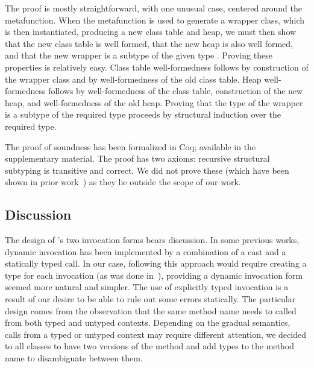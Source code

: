 \documentclass[USenglish]{tex/lipics-v2016}
\begin{document}
\noindent
The proof is mostly straightforward, with one unusual case, centered around
the  metafunction. When the  metafunction is used to
generate a wrapper class, which is then instantiated, producing a new class
table and heap, we must then show that the new class table is well formed,
that the new heap is also well formed, and that the new wrapper is a subtype
of the given type \C.  Proving these properties is relatively easy.  Class
table well-formedness follows by construction of the wrapper class and by
well-formedness of the old class table. Heap well-formedness follows by
well-formedness of the class table, construction of the new heap, and
well-formedness of the old heap.  Proving that the type of the wrapper is a
subtype of the required type proceeds by structural induction over the
required type.

The proof of soundness has been formalized in Coq; available in the
supplementary material. The proof has two axioms: recursive structural
subtyping is transitive and correct. We did not prove these (which have been
shown in prior work~\cite{JonesStructural}) as they lie outside the scope of
our work.


\subsection{Discussion}

The design of \kafka's two invocation forms bears discussion. In some
previous works, dynamic invocation has been implemented by a combination of
a cast and a statically typed call.  In our case, following this approach
would require creating a type for each invocation (as was done
in~\cite{popl10}), providing a dynamic invocation form seemed more natural
and simpler. The use of explicitly typed invocation is a result of our
desire to be able to rule out some errors statically. The particular design
comes from the observation that the same method name needs to called from
both typed and untyped contexts. Depending on the gradual semantics, calls
from a typed or untyped context may require different attention, we decided
to all classes to have two versions of the method and add types to the
method name to disambiguate between them.
\end{document}

